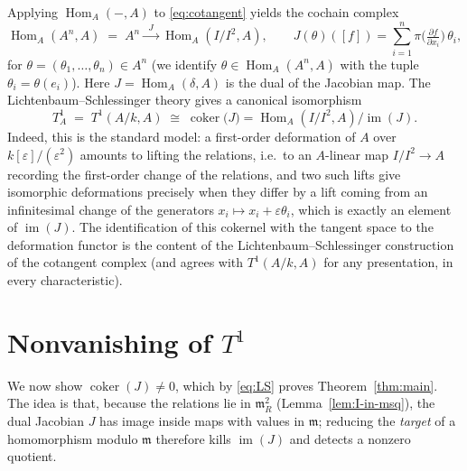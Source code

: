 \documentclass{amsart}
\begin{document}
Applying $\operatorname{Hom}_A(-,A)$ to \eqref{eq:cotangent} yields the
cochain complex
\begin{equation}\label{eq:dual-complex}
\operatorname{Hom}_A(A^n,A)\;=\;A^n
\xrightarrow{\;\;J\;\;}
\operatorname{Hom}_A(I/I^2,A),
\qquad
J(\theta)([f])=\sum_{i=1}^n \pi\!\Big(\tfrac{\partial f}{\partial x_i}\Big)\,\theta_i ,
\end{equation}
for $\theta=(\theta_1,\dots,\theta_n)\in A^n$ (we identify
$\theta\in\operatorname{Hom}_A(A^n,A)$ with the tuple $\theta_i=\theta(e_i)$).
Here $J=\operatorname{Hom}_A(\delta,A)$ is the dual of the Jacobian map. The
Lichtenbaum--Schlessinger theory gives a canonical isomorphism
\begin{equation}\label{eq:LS}
T^1_A\;=\;T^1(A/k,A)\;\cong\;\operatorname{coker}\bigl(J\bigr)
=\operatorname{Hom}_A(I/I^2,A)\big/\operatorname{im}(J).
\end{equation}
Indeed, this is the standard model: a first-order deformation of $A$ over
$k[\varepsilon]/(\varepsilon^2)$ amounts to lifting the relations, i.e.\ to an
$A$-linear map $I/I^2\to A$ recording the first-order change of the relations,
and two such lifts give isomorphic deformations precisely when they differ by a
lift coming from an infinitesimal change of the generators $x_i\mapsto x_i+
\varepsilon\theta_i$, which is exactly an element of $\operatorname{im}(J)$. The
identification of this cokernel with the tangent space to the deformation functor
is the content of the Lichtenbaum--Schlessinger construction of the cotangent
complex (and agrees with $T^1(A/k,A)$ for any presentation, in every
characteristic).

\section{Nonvanishing of $T^1$}

We now show $\operatorname{coker}(J)\neq 0$, which by \eqref{eq:LS} proves
Theorem~\ref{thm:main}. The idea is that, because the relations lie in
$\mathfrak m_R^2$ (Lemma~\ref{lem:I-in-msq}), the dual Jacobian $J$ has image
inside maps with values in $\mathfrak m$; reducing the \emph{target} of a homomorphism
modulo $\mathfrak m$ therefore kills $\operatorname{im}(J)$ and detects a nonzero
quotient.
\end{document}
